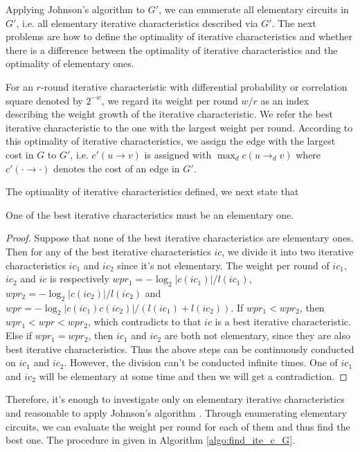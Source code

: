 Applying Johnson's algorithm \cite{johnson1975finding} to $G'$, we can enumerate all elementary circuits in $G'$, i.e. all elementary iterative characteristics described via $G'$. The next problems are how to define the optimality of iterative characteristics and whether there is a difference between the optimality of iterative characteristics and the optimality of elementary ones. 

For an $r$-round iterative characteristic with differential probability or correlation square denoted by $2^{-w}$, we regard its weight per round $w/r$ as an index describing the weight growth of the iterative characteristic. We refer the best iterative characteristic to the one with the largest weight per round. According to this optimality of iterative characteristics, we assign the edge with the largest cost in $G$ to $G'$, i.e. $c'(u\rightarrow v)$ is assigned with $\max_d c(u\rightarrow_d v)$ where $c'(\cdot\rightarrow\cdot)$ denotes the cost of an edge in $G'$. 

The optimality of iterative characteristics defined, we next state that
\begin{theorem}
    One of the best iterative characteristics must be an elementary one.
\end{theorem}
\begin{proof}
    Suppose that none of the best iterative characteristics are elementary ones. Then for any of the best iterative characteristics $ic$, we divide it into two iterative characteristics $ic_1$ and $ic_2$ since it's not elementary. The weight per round of $ic_1$, $ic_2$ and $ic$ is respectively $wpr_1=-\log_2|c(ic_1)|/l(ic_1)$, $wpr_2=-\log_2|c(ic_2)|/l(ic_2)$ and $wpr=-\log_2|c(ic_1)c(ic_2)|/(l(ic_1)+l(ic_2))$. If $wpr_1< wpr_2$, then $wpr_1<wpr<wpr_2$, which contradicts to that $ic$ is a best iterative characteristic. Else if $wpr_1=wpr_2$, then $ic_1$ and $ic_2$ are both not elementary, since they are also best iterative characteristics. Thus the above steps can be continuously conducted on $ic_1$ and $ic_2$. However, the division can't be conducted infinite times. One of $ic_1$ and $ic_2$ will be elementary at some time and then we will get a contradiction.
\end{proof}

Therefore, it's enough to investigate only on elementary iterative characteristics and reasonable to apply Johnson's algorithm \cite{johnson1975finding}. Through enumerating elementary circuits, we can evaluate the weight per round for each of them and thus find the best one. The procedure in given in Algorithm \ref{algo:find_ite_c_G}. 

